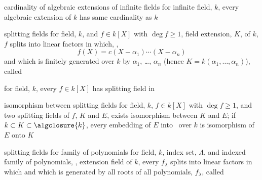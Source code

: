 \documentclass[17pt,landscape]{foils}
\begin{document}
{\vfill
\begin{mytheorem}{cardinality of algebraic extensions of infinite fields}%
	for infinite field, $k$,
	every algebraic extension of $k$
	has same cardinality as $k$
\end{mytheorem}


%

\begin{mydefinition}{splitting fields}
	for field, $k$, and $f\in k[X]$ with $\deg f \geq 1$,
	field extension, $K$, of $k$,
	$f$ splits into linear factors in which,
	\ie,
	$$
		f(X) = c (X-\alpha_1) \cdots (X-\alpha_n)
	$$
	and which is finitely generated over $k$ by $\alpha_1$, \ldots, $\alpha_n$
	(hence $K=k(\alpha_1, \ldots, \alpha_n)$),
	called 
\end{mydefinition}

\bit
\item
	for field, $k$,
	every $f\in k[X]$
	has splitting field
	in \
\eit

\begin{mytheorem}{isomorphism between splitting fields}%
	for field, $k$, $f\in k[X]$ with $\deg f \geq1$,
	and two splitting fields of $f$, $K$ and $E$,
	exists isomorphism between $K$ and $E$;
	if $k\subset K\subset {}$,
	every embedding of $E$ into \algclosure{k}\
	over $k$
	is isomorphism of $E$ onto $K$\
\end{mytheorem}



\begin{mydefinition}{splitting fields for family of polynomials}
	for field, $k$,
	index set, $\Lambda$,
	and indexed family of polynomials,
	,
	extension field of $k$,
	every $f_\lambda$ splits into linear factors in which
	and
	which is generated by all roots of all polynomials, $f_\lambda$,
	called \
\end{mydefinition}

}
\end{document}
